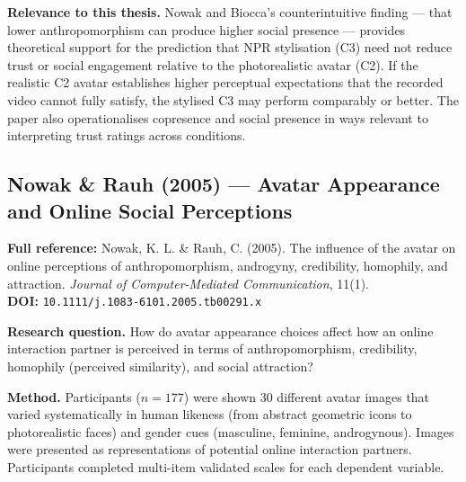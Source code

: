 \documentclass[11pt, a4paper]{article}
\begin{document}
\textbf{Relevance to this thesis.} Nowak and Biocca's counterintuitive finding --- that lower anthropomorphism can produce higher social presence --- provides theoretical support for the prediction that NPR stylisation (C3) need not reduce trust or social engagement relative to the photorealistic avatar (C2). If the realistic C2 avatar establishes higher perceptual expectations that the recorded video cannot fully satisfy, the stylised C3 may perform comparably or better. The paper also operationalises copresence and social presence in ways relevant to interpreting trust ratings across conditions.

\vspace{8pt}
\subsection{Nowak \& Rauh (2005) --- Avatar Appearance and Online Social Perceptions}

\begin{refbox}
\textbf{Full reference:} Nowak, K. L. \& Rauh, C. (2005). The influence of the avatar on online perceptions of anthropomorphism, androgyny, credibility, homophily, and attraction. \textit{Journal of Computer-Mediated Communication}, 11(1).\\[4pt]
\textbf{DOI:} \texttt{10.1111/j.1083-6101.2005.tb00291.x}
\end{refbox}

\textbf{Research question.} How do avatar appearance choices affect how an online interaction partner is perceived in terms of anthropomorphism, credibility, homophily (perceived similarity), and social attraction?

\textbf{Method.} Participants ($n = 177$) were shown 30 different avatar images that varied systematically in human likeness (from abstract geometric icons to photorealistic faces) and gender cues (masculine, feminine, androgynous). Images were presented as representations of potential online interaction partners. Participants completed multi-item validated scales for each dependent variable.
\end{document}
